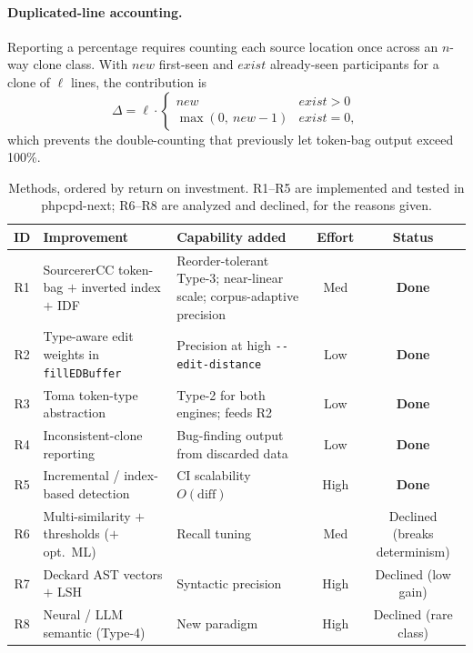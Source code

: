 \documentclass[10pt,a4paper]{article}
\newcounter{lem}[section]
\begin{document}
\paragraph{Duplicated-line accounting.} Reporting a percentage requires counting each source location
once across an $n$-way clone class. With $\mathit{new}$ first-seen and $\mathit{exist}$ already-seen
participants for a clone of $\ell$ lines, the contribution is
\[
\Delta = \ell\cdot\begin{cases}\mathit{new} & \mathit{exist}>0\\[2pt]\max(0,\ \mathit{new}-1) &
\mathit{exist}=0,\end{cases}
\]
which prevents the double-counting that previously let token-bag output exceed 100\%.

\begin{table}[h]
\centering
\caption{Methods, ordered by return on investment. R1--R5 are implemented and tested in
phpcpd-next; R6--R8 are analyzed and declined, for the reasons given.}
\label{tab:roadmap}
\footnotesize
\renewcommand{\arraystretch}{1.2}
\begin{tabular}{@{}c p{3.5cm} p{4.2cm} c c@{}}
\toprule
\textbf{ID} & \textbf{Improvement} & \textbf{Capability added} & \textbf{Effort} & \textbf{Status} \\
\midrule
R1 & SourcererCC token-bag $+$ inverted index $+$ IDF & Reorder-tolerant Type-3; near-linear scale;
     corpus-adaptive precision & Med & \textbf{Done} \\
R2 & Type-aware edit weights in \lstinline!fillEDBuffer! & Precision at high
     \texttt{-{}-edit-distance} & Low & \textbf{Done} \\
R3 & Toma token-type abstraction & Type-2 for both engines; feeds R2 & Low & \textbf{Done} \\
R4 & Inconsistent-clone reporting & Bug-finding output from discarded data & Low & \textbf{Done} \\
R5 & Incremental / index-based detection & CI scalability $O(\text{diff})$ & High & \textbf{Done} \\
R6 & Multi-similarity $+$ thresholds ($+$ opt.\ ML) & Recall tuning & Med & Declined (breaks determinism) \\
R7 & Deckard AST vectors $+$ LSH~\cite{deckard} & Syntactic precision & High & Declined (low gain) \\
R8 & Neural / LLM semantic (Type-4) & New paradigm & High & Declined (rare class) \\
\bottomrule
\end{tabular}
\end{table}
\end{document}
